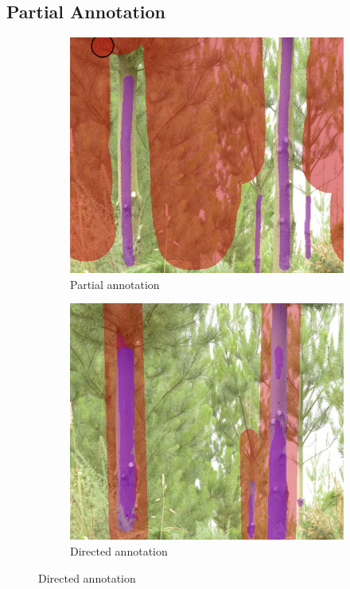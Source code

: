 \documentclass{article}
\begin{document}
\subsection {Partial Annotation}


\begin{figure}[h!]
\centering
\begin{subfigure}[t]{.3\textwidth}
  \centering
  \includegraphics[width=0.8\linewidth]{images/loose.png}
  \caption{Partial annotation}
  \label{fig:loose_annot}
\end{subfigure}%
\begin{subfigure}[t]{.3\textwidth}
  \centering
  \includegraphics[width=0.8\linewidth]{images/loose_directed.png}
  \caption{Directed annotation}
  \label{fig:loose_dir}


\end{subfigure}
\end{figure}
\end{document}
